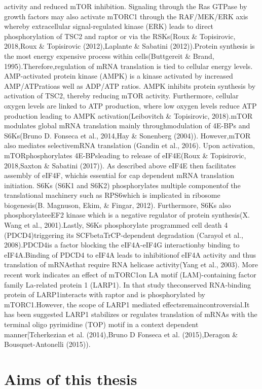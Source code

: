 \documentclass[12pt,openany]{book}
\begin{document}
activity and reduced mTOR inhibition. Signaling through the Ras GTPase
by growth factors may also activate mTORC1 through the RAF/MEK/ERK axis
whereby extracellular signal-regulated kinase (ERK) leads to direct
phosphorylation of TSC2 and raptor or via the RSKs(Roux \& Topisirovic,
2018,Roux \& Topisirovic (2012),Laplante \& Sabatini (2012)).Protein
synthesis is the most energy expensive process within cells(Buttgereit
\& Brand, 1995).Therefore,regulation of mRNA translation is tied to
cellular energy levels. AMP-activated protein kinase (AMPK) is a kinase
activated by increased AMP/ATPratioas well as ADP/ATP ratios. AMPK
inhibits protein synthesis by activation of TSC2, thereby reducing mTOR
activity. Furthermore, cellular oxygen levels are linked to ATP
production, where low oxygen levels reduce ATP production leading to
AMPK activation(Leibovitch \& Topisirovic, 2018).mTOR modulates global
mRNA translation mainly throughmodulation of 4E-BPs and S6Ks(Bruno D.
Fonseca et al., 2014,Hay \& Sonenberg (2004)). However,mTOR also
mediates selectivemRNA translation (Gandin et al., 2016). Upon
activation, mTORphosphorylates 4E-BPsleading to release of eIF4E(Roux \&
Topisirovic, 2018,Saxton \& Sabatini (2017)). As described above eIF4E
then facilitates assembly of eIF4F, whichis essential for cap dependent
mRNA translation initiation. S6Ks (S6K1 and S6K2) phosphorylates
multiple componentof the translational machinery such as RPS6which is
implicated in ribosome biogenesis(B. Magnuson, Ekim, \& Fingar, 2012).
Furthermore, S6Ks also phosphorylateeEF2 kinase which is a negative
regulator of protein synthesis(X. Wang et al., 2001).Lastly, S6Ks
phosphorylate programmed cell death 4 (PDCD4)triggering its
SCFbetaTrCP-dependent degradation (Carayol et al., 2008).PDCD4is a
factor blocking the eIF4A-eIF4G interactionby binding to eIF4A.Binding
of PDCD4 to eIF4A leads to inhibitionof eIF4A activity and thus
translation of mRNAsthat require RNA helicase activity(Yang et al.,
2003). More recent work indicates an effect of mTORC1on LA motif
(LAM)-containing factor family La-related protein 1 (LARP1). In that
study theconserved RNA-binding protein of LARP1interacts with raptor and
is phosphorylated by mTORC1.However, the scope of LARP1 mediated
effectsremaincontroversial.It has been suggested LARP1 stabilizes or
regulates translation of mRNAs with the terminal oligo pyrimidine (TOP)
motif in a context dependent manner{[}Tcherkezian et al. (2014),Bruno D
Fonseca et al. (2015),Deragon \& Bousquet-Antonelli (2015)).

\chapter{Aims of this thesis}
\end{document}
